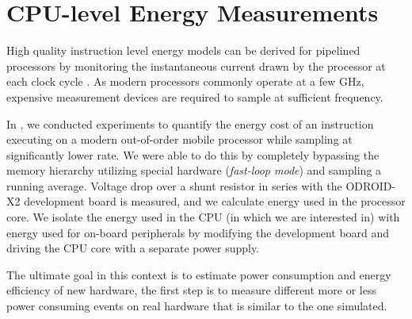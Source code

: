 \section{CPU-level Energy Measurements}

High quality instruction level energy models can be derived for pipelined
processors by monitoring the instantaneous current drawn by the processor at
each clock cycle \cite{nikolaidis2005instruction}. As modern processors commonly
operate at a few GHz, expensive measurement devices are required to sample
at sufficient frequency.

In \cite{rundehvatum2013exploring}, we conducted experiments to quantify the
energy cost of an instruction executing on a modern out-of-order mobile
processor while sampling at significantly lower rate. We were able to do this by
completely bypassing the memory hierarchy utilizing special hardware
(\emph{fast-loop mode}) and sampling a running average. Voltage drop
over a shunt resistor in series with the ODROID-X2 development board is
measured, and we calculate energy used in the processor core. We isolate
the energy used in the CPU (in which we are interested in) with energy used for
on-board peripherals by modifying the development board and driving the CPU core
with a separate power supply.

The ultimate goal in this context is to estimate power consumption and energy
efficiency of new hardware, the first step is to measure different more or less
power consuming events on real hardware that is similar to the one simulated.

